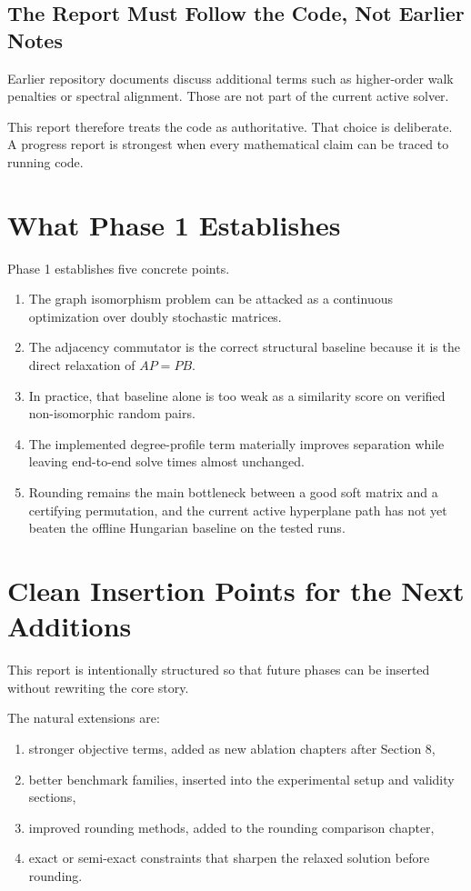 \documentclass[11pt]{article}
\begin{document}
\subsection{The Report Must Follow the Code, Not Earlier Notes}

Earlier repository documents discuss additional terms such as higher-order walk penalties or spectral alignment.
Those are not part of the current active solver.

This report therefore treats the code as authoritative.
That choice is deliberate.
A progress report is strongest when every mathematical claim can be traced to running code.

\section{What Phase 1 Establishes}

Phase 1 establishes five concrete points.

\begin{enumerate}[label=\arabic*.]
    \item The graph isomorphism problem can be attacked as a continuous optimization over doubly stochastic matrices.
    \item The adjacency commutator is the correct structural baseline because it is the direct relaxation of $AP = PB$.
    \item In practice, that baseline alone is too weak as a similarity score on verified non-isomorphic random pairs.
    \item The implemented degree-profile term materially improves separation while leaving end-to-end solve times almost unchanged.
    \item Rounding remains the main bottleneck between a good soft matrix and a certifying permutation, and the current active hyperplane path has not yet beaten the offline Hungarian baseline on the tested runs.
\end{enumerate}

\section{Clean Insertion Points for the Next Additions}

This report is intentionally structured so that future phases can be inserted without rewriting the core story.

The natural extensions are:
\begin{enumerate}[label=\arabic*.]
    \item stronger objective terms, added as new ablation chapters after Section 8,
    \item better benchmark families, inserted into the experimental setup and validity sections,
    \item improved rounding methods, added to the rounding comparison chapter,
    \item exact or semi-exact constraints that sharpen the relaxed solution before rounding.
\end{enumerate}
\end{document}

